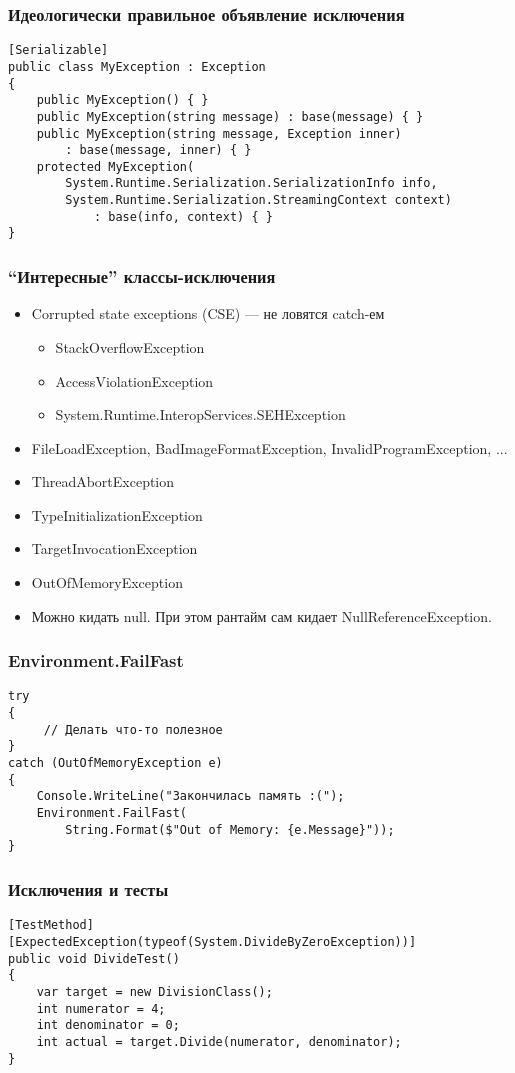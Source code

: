 \documentclass[xetex,mathserif,serif]{beamer}
\begin{document}
	\begin{frame}[fragile]
		\frametitle{Идеологически правильное объявление исключения}
		\begin{verbatim}
[Serializable]
public class MyException : Exception
{
    public MyException() { }
    public MyException(string message) : base(message) { }
    public MyException(string message, Exception inner) 
        : base(message, inner) { }
    protected MyException(
        System.Runtime.Serialization.SerializationInfo info,
        System.Runtime.Serialization.StreamingContext context)
            : base(info, context) { }
}
		\end{verbatim}
	\end{frame}

	\begin{frame}
		\frametitle{``Интересные'' классы-исключения}
		\begin{itemize}
			\item Corrupted state exceptions (CSE) --- не ловятся catch-ем
			\begin{itemize}
				\item StackOverflowException
				\item AccessViolationException
				\item System.Runtime.InteropServices.SEHException
			\end{itemize}
			\item FileLoadException, BadImageFormatException, InvalidProgramException, ...
			\item ThreadAbortException
			\item TypeInitializationException
			\item TargetInvocationException
			\item OutOfMemoryException
			\item Можно кидать null. При этом рантайм сам кидает NullReferenceException.
		\end{itemize}
	\end{frame}

	\begin{frame}[fragile]
		\frametitle{Environment.FailFast}
		\begin{verbatim}
try 
{
     // Делать что-то полезное
}
catch (OutOfMemoryException e) 
{
    Console.WriteLine("Закончилась память :(");
    Environment.FailFast(
        String.Format($"Out of Memory: {e.Message}"));
}
		\end{verbatim}
	\end{frame}

	\begin{frame}[fragile]
		\frametitle{Исключения и тесты}
		\begin{verbatim}
[TestMethod]
[ExpectedException(typeof(System.DivideByZeroException))]
public void DivideTest()
{
    var target = new DivisionClass();
    int numerator = 4;
    int denominator = 0;
    int actual = target.Divide(numerator, denominator);
}
		\end{verbatim}
	\end{frame}
\end{document}

